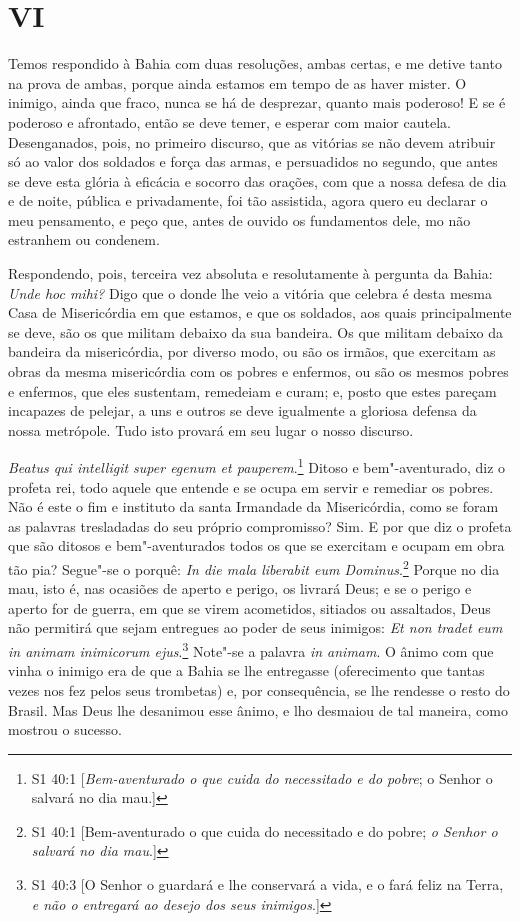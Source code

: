 \section{VI}

Temos respondido à Bahia com duas resoluções, ambas certas, e me detive
tanto na prova de ambas, porque ainda estamos em tempo de as haver
mister. O inimigo, ainda que fraco, nunca se há de desprezar, quanto
mais poderoso! E se é poderoso e afrontado, então se deve temer, e
esperar com maior cautela. Desenganados, pois, no primeiro discurso, que
as vitórias se não devem atribuir só ao valor dos soldados e força das
armas, e persuadidos no segundo, que antes se deve esta glória à
eficácia e socorro das orações, com que a nossa defesa de dia e de
noite, pública e privadamente, foi tão assistida, agora quero eu
declarar o meu pensamento, e peço que, antes de ouvido os fundamentos
dele, mo não estranhem ou condenem.

Respondendo, pois, terceira vez absoluta e resolutamente à pergunta da
Bahia: \emph{Unde hoc mihi?} Digo que o donde lhe veio a vitória que
celebra é desta mesma Casa de Misericórdia em que estamos, e que os
soldados, aos quais principalmente se deve, são os que militam debaixo
da sua bandeira. Os que militam debaixo da bandeira da misericórdia, por
diverso modo, ou são os irmãos, que exercitam as obras da mesma
misericórdia com os pobres e enfermos, ou são os mesmos pobres e
enfermos, que eles sustentam, remedeiam e curam; e, posto que estes
pareçam incapazes de pelejar, a uns e outros se deve igualmente a
gloriosa defensa da nossa metrópole.
Tudo isto provará em seu lugar o nosso discurso.

\emph{Beatus qui intelligit super egenum et pauperem}.\footnote{S1 40:1 [\textit{Bem-aventurado o que cuida do necessitado e do pobre}; o Senhor o salvará no dia mau.]} Ditoso e bem"-aventurado,
diz o profeta rei, todo aquele que entende e se ocupa em servir e
remediar os pobres. Não é este o fim e instituto da santa Irmandade
da Misericórdia, como se foram as palavras tresladadas do seu próprio
compromisso? Sim. E por que diz o profeta que são ditosos e
bem"-aventurados todos os que se exercitam e ocupam em obra tão pia?
Segue"-se o porquê: \emph{In die mala liberabit eum Dominus}.\footnote{S1 40:1 [Bem-aventurado o que cuida do necessitado e do pobre; \textit{o Senhor o salvará no dia mau}.]}
Porque no dia mau, isto é, nas ocasiões de aperto e perigo, os
livrará Deus; e se o perigo e aperto for de guerra, em que se virem
acometidos, sitiados ou assaltados, Deus não permitirá que sejam
entregues ao poder de seus inimigos: \emph{Et non tradet eum in animam
inimicorum ejus}.\footnote{S1 40:3 [O Senhor o guardará e lhe conservará a vida, e o fará feliz na Terra, \textit{e não o entregará ao desejo dos seus inimigos}.]} Note"-se a palavra \emph{in animam}. O ânimo
com que vinha o inimigo era de que a Bahia se lhe entregasse
(oferecimento que tantas vezes nos fez pelos seus trombetas) e, por
consequência, se lhe rendesse o resto do Brasil. Mas Deus lhe
desanimou esse ânimo, e lho desmaiou de tal maneira, como mostrou o
sucesso.


